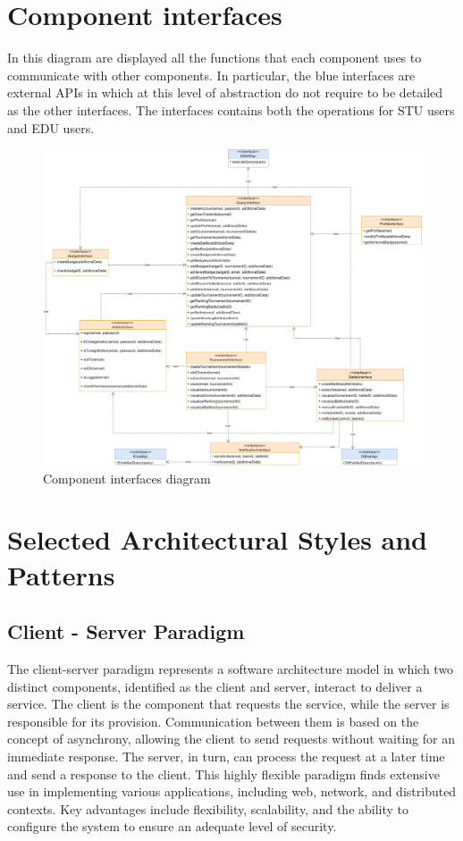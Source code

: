 \section{Component interfaces}
In this diagram are displayed all the functions that each component uses to communicate with other components. In particular, the blue interfaces are external APIs in which at this level of abstraction do not require to be detailed as the other interfaces. The interfaces contains both the operations for STU users and EDU users. 
\begin{figure}[H]
    \centering
    \includegraphics[width=\textwidth]{images/diagrams/ComponentInterfaces.png}
    \caption{Component interfaces diagram}
\end{figure}

\newpage

\section{Selected Architectural Styles and Patterns}
\subsection{Client - Server Paradigm}
The client-server paradigm represents a software architecture model in which two distinct components, identified as the client and server, interact to deliver a service. 
The client is the component that requests the service, while the server is responsible for its provision.
Communication between them is based on the concept of asynchrony, allowing the client to send requests without waiting for an immediate response. 
The server, in turn, can process the request at a later time and send a response to the client. This highly flexible paradigm finds extensive use in implementing various applications, including web, network, and distributed contexts.
Key advantages include flexibility, scalability, and the ability to configure the system to ensure an adequate level of security.

